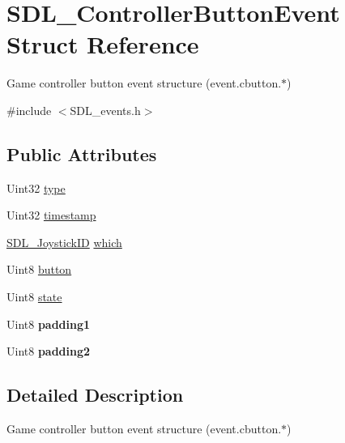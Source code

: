 \hypertarget{struct_s_d_l___controller_button_event}{}\section{S\+D\+L\+\_\+\+Controller\+Button\+Event Struct Reference}
\label{struct_s_d_l___controller_button_event}


Game controller button event structure (event.\+cbutton.$\ast$)  




{\ttfamily \#include $<$S\+D\+L\+\_\+events.\+h$>$}

\subsection*{Public Attributes}
\begin{DoxyCompactItemize}
\item 
Uint32 \mbox{\hyperlink{struct_s_d_l___controller_button_event_a09869d792031e47a88673d85915c209f}{type}}
\item 
Uint32 \mbox{\hyperlink{struct_s_d_l___controller_button_event_a73003712734c4d2f966db3d7c2ce826b}{timestamp}}
\item 
\mbox{\hyperlink{_s_d_l__joystick_8h_a3c3d32500cb08f76ee8077983912c0bd}{S\+D\+L\+\_\+\+Joystick\+ID}} \mbox{\hyperlink{struct_s_d_l___controller_button_event_a98777e88b5d5cae83eef16ffd4bcacc1}{which}}
\item 
Uint8 \mbox{\hyperlink{struct_s_d_l___controller_button_event_a039da6cd31c3c62e62a3ae17cc64d0db}{button}}
\item 
Uint8 \mbox{\hyperlink{struct_s_d_l___controller_button_event_a00c46683f86674c2a4f74404ee3e857c}{state}}
\item 
\mbox{\label{struct_s_d_l___controller_button_event_a34d3e43fc1994288b9b083c874bc0899}} 
Uint8 {\bfseries padding1}
\item 
\mbox{\label{struct_s_d_l___controller_button_event_a8caf56a3921227913cfb652d5de1eec4}} 
Uint8 {\bfseries padding2}
\end{DoxyCompactItemize}


\subsection{Detailed Description}
Game controller button event structure (event.\+cbutton.$\ast$) 


